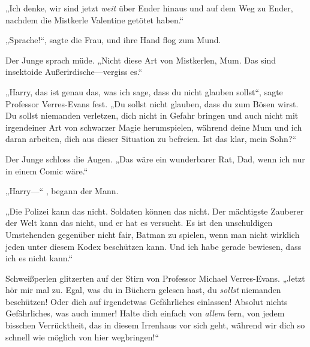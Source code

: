 „Ich denke, wir sind jetzt \emph{weit} über Ender hinaus und auf dem Weg zu Ender, nachdem die Mistkerle Valentine getötet haben.“

„Sprache!“, sagte die Frau, und ihre Hand flog zum Mund.

Der Junge sprach müde. „Nicht diese Art von Mistkerlen, Mum. Das sind insektoide Außerirdische—vergiss es.“

„Harry, das ist genau das, was ich sage, dass du nicht glauben sollst“, sagte Professor Verres-Evans fest. „Du sollst nicht glauben, dass du zum Bösen wirst. Du sollst niemanden verletzen, dich nicht in Gefahr bringen und auch nicht mit irgendeiner Art von schwarzer Magie herumspielen, während deine Mum und ich daran arbeiten, dich aus dieser Situation zu befreien. Ist das klar, mein Sohn?“

Der Junge schloss die Augen.
„Das wäre ein wunderbarer Rat, Dad, wenn ich nur in einem Comic wäre.“

„Harry—“ , begann der Mann.

„Die Polizei kann das nicht. Soldaten können das nicht. Der mächtigste Zauberer der Welt kann das nicht, und er hat es versucht. Es ist den unschuldigen Umstehenden gegenüber nicht fair, Batman zu spielen, wenn man nicht wirklich jeden unter diesem Kodex beschützen kann. Und ich habe gerade bewiesen, dass ich es nicht kann.“

Schweißperlen glitzerten auf der Stirn von Professor Michael Verres-Evans.
„Jetzt hör mir mal zu. Egal, was du in Büchern gelesen hast, du \emph{sollst} niemanden beschützen! Oder dich auf irgendetwas Gefährliches einlassen! Absolut nichts Gefährliches, was auch immer! Halte dich einfach von \emph{allem} fern, von jedem bisschen Verrücktheit, das in diesem Irrenhaus vor sich geht, während wir dich so schnell wie möglich von hier wegbringen!“

